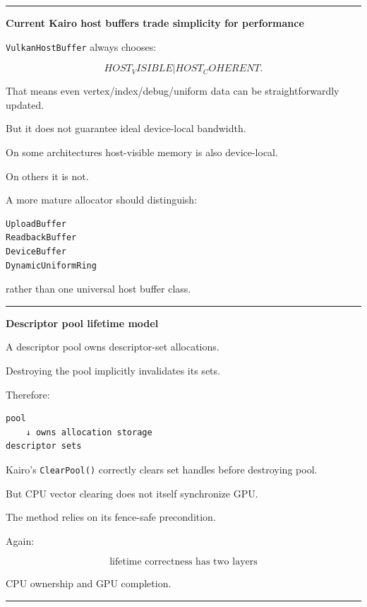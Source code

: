 \begin{center}\rule{0.5\linewidth}{0.5pt}\end{center}

\textbf{Current Kairo host buffers trade simplicity for performance}

\texttt{VulkanHostBuffer} always chooses:

\[
HOST_VISIBLE
|
HOST_COHERENT.
\]

That means even vertex/index/debug/uniform data can be straightforwardly updated.

But it does not guarantee ideal device-local bandwidth.

On some architectures host-visible memory is also device-local.

On others it is not.

A more mature allocator should distinguish:

\begin{verbatim}
UploadBuffer
ReadbackBuffer
DeviceBuffer
DynamicUniformRing
\end{verbatim}

rather than one universal host buffer class.

\begin{center}\rule{0.5\linewidth}{0.5pt}\end{center}

\textbf{Descriptor pool lifetime model}

A descriptor pool owns descriptor-set allocations.

Destroying the pool implicitly invalidates its sets.

Therefore:

\begin{verbatim}
pool
    ↓ owns allocation storage
descriptor sets
\end{verbatim}

Kairo's \texttt{ClearPool()} correctly clears set handles before destroying pool.

But CPU vector clearing does not itself synchronize GPU.

The method relies on its fence-safe precondition.

Again:

\[
\boxed{
\text{lifetime correctness has two layers}
}
\]

CPU ownership and GPU completion.

\begin{center}\rule{0.5\linewidth}{0.5pt}\end{center}

